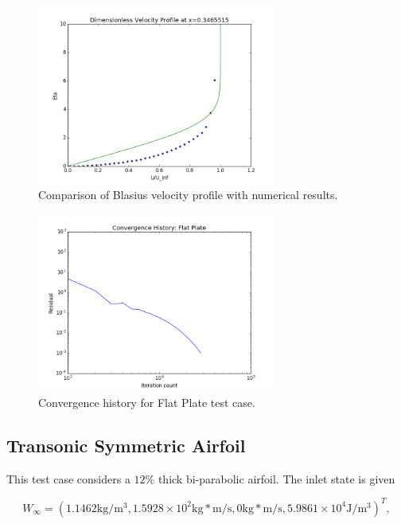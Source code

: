 \documentclass{article}
\begin{document}
\newpage
\begin{figure}[!ht]
\centering
\includegraphics[width=0.7\textwidth]{images/plate_profile.png}
\caption{Comparison of Blasius velocity profile with numerical results.}
\label{fig:plate_profile}
\end{figure}

\begin{figure}[!ht]
\centering
\includegraphics[width=0.7\textwidth]{images/plate_convergence.png}
\caption{Convergence history for Flat Plate test case.}
\label{fig:plate_convergence}
\end{figure}

\newpage
\subsection{Transonic Symmetric Airfoil}
This test case considers a $12\%$ thick bi-parabolic airfoil. The inlet state is given

\begin{equation*}
W_{\infty} = (1.1462 \text{kg}/\text{m}^3,1.5928\times10^2\text{kg}*\text{m}/\text{s},0\text{kg}*\text{m}/\text{s},5.9861\times10^4\text{J}/\text{m}^3)^T,
\end{equation*}
\end{document}
